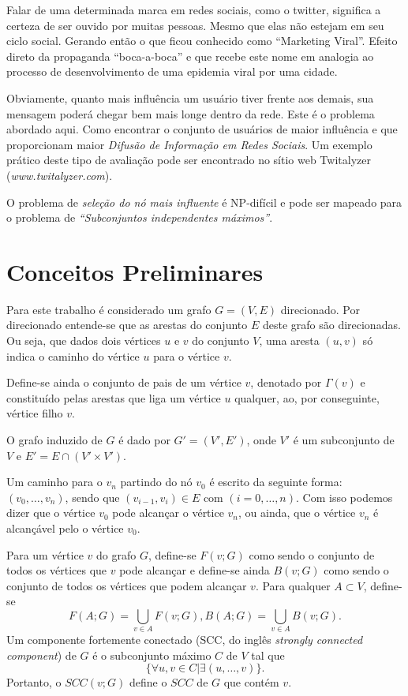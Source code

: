 \documentclass{acm_proc_article-sp}
\begin{document}
Falar de uma determinada marca em redes sociais, como o twitter, significa a certeza de ser ouvido por muitas pessoas. Mesmo que elas
não estejam em seu ciclo social. Gerando então o que ficou conhecido como ``Marketing Viral''. Efeito direto da propaganda 
``boca-a-boca'' e que recebe este nome em analogia ao processo de desenvolvimento de uma epidemia viral por uma cidade.

Obviamente, quanto mais influência um usuário tiver frente aos demais, sua mensagem poderá chegar bem mais longe dentro da rede. 
Este é o problema abordado aqui. Como encontrar o conjunto de usuários de maior influência e que proporcionam maior \textit{Difusão
de Informação em Redes Sociais}. Um exemplo prático deste tipo de avaliação pode ser encontrado no sítio web Twitalyzer 
(\textit{www.twitalyzer.com}).

O problema de \textit{seleção do nó mais influente} é NP-difícil \cite{kempe:2003} e pode ser mapeado para o problema de \textit{``Subconjuntos 
independentes máximos''}.

\section{Conceitos Preliminares}
Para este trabalho é considerado um grafo $G = (V,E)$ direcionado. Por direcionado entende-se que as arestas do
conjunto $E$ deste grafo são direcionadas. Ou seja, que dados dois vértices $u$ e $v$ do conjunto $V$, uma aresta
$(u,v)$ só indica o caminho do vértice $u$ para o vértice $v$.

Define-se ainda o conjunto de pais de um vértice $v$, denotado por $\Gamma(v)$ e constituído pelas arestas
que liga um vértice $u$ qualquer, ao, por conseguinte, vértice filho $v$.

O grafo induzido de $G$ é dado por $G' = (V', E')$, onde $V'$ é um subconjunto de $V$ e $E'
= E \cap (V' \times V')$.

Um caminho para o $v_{n}$ partindo do nó $v_{0}$ é escrito da seguinte forma: $(v_{0}, \ldots, v_{n})$, sendo que
$(v_{i-1}, v_{i}) \in E$ com $(i=0,\ldots, n)$. Com isso podemos dizer que o vértice $v_{0}$ pode alcançar o
vértice $v_{n}$, ou ainda, que o vértice $v_{n}$ é alcançável pelo o vértice $v_{0}$. 

Para um vértice $v$ do grafo $G$, define-se $F(v;G)$ como sendo o conjunto de todos os vértices que $v$ pode
alcançar e define-se ainda $B(v;G)$ como sendo o conjunto de todos os vértices que podem alcançar $v$. Para
qualquer $A \subset V$, define-se
$$ 
F(A;G) = \bigcup_{v \in A} F(v;G), B(A;G) = \bigcup_{v \in A} B(v;G).
$$
Um componente fortemente conectado (SCC, do inglês \textit{strongly connected component}) de $G$ é o subconjunto
máximo $C$ de $V$ tal que
$$
\{\forall u,v \in C | \exists (u,\ldots ,v)\}.
$$
Portanto, o $SCC(v;G)$ define o $SCC$ de $G$ que contém $v$. 
\end{document}
